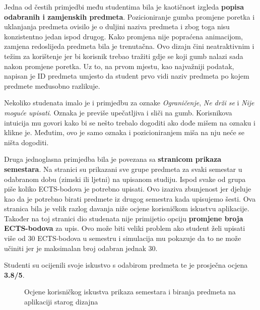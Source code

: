 \documentclass[times, utf8, zavrsni, numeric]{fer}
\begin{document}
        Jedna od čestih primjedbi među studentima bila je kaotičnost izgleda \textbf{popisa odabranih i zamjenskih predmeta}. Pozicioniranje gumba promjene poretka i uklanjanja predmeta ovisilo je o duljini naziva predmeta i zbog toga nisu konzistentno jedan ispod drugog. Kako promjena nije popraćena animacijom, zamjena redoslijeda predmeta bila je trenutačna. Ovo dizajn čini neatraktivnim i težim za korištenje jer bi korisnik trebao tražiti gdje se koji gumb nalazi sada nakon promjene poretka.
        Uz to, na prvom mjestu, kao najvažniji podatak, napisan je ID predmeta umjesto da student prvo vidi naziv predmeta po kojem predmete međusobno razlikuje.
        
        Nekoliko studenata imalo je i primjedbu za oznake \textit{Ograničenje}, \textit{Ne drži se} i \textit{Nije moguće upisati}. Oznaka je previše upečatljiva i sliči na gumb. Korisnikova intuicija mu govori kako bi se nešto trebalo dogoditi ako dođe mišem na oznaku i klikne je. Međutim, ovo je samo oznaka i pozicioniranjem miša na nju neće se ništa dogoditi.
        
        Druga jednoglasna primjedba bila je povezana sa \textbf{stranicom prikaza semestara}. Na stranici su prikazani sve grupe predmeta za svaki semestar u odabranom dobu (zimski ili ljetni) na upisanom studiju. Ispod svake od grupa piše koliko ECTS-bodova je potrebno upisati. Ovo izaziva zbunjenost jer djeluje kao da je potrebno birati predmete iz drugog semestra kada upisujemo šesti. Ova stranica bila je velik razlog davanja niže ocjene korisničkom iskustvu aplikacije. Također na toj stranici dio studenata nije primijetio opciju \textbf{promjene broja ECTS-bodova} za upis. Ovo može biti veliki problem ako student želi upisati više od 30 ECTS-bodova u semestru i simulacija mu pokazuje da to ne može učiniti jer je maksimalan broj odabran jednak 30.
        
        Studenti su ocijenili svoje iskustvo s odabirom predmeta te je prosječna ocjena \textbf{3.8/5}.
        
        \begin{figure} [H]
          \centering
          \caption{Ocjene korisničkog iskustva prikaza semestara i biranja predmeta na aplikaciji starog dizajna}
        \end{figure}
        
\end{document}
